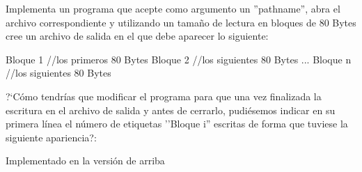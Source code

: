 \begin{exercise}
Implementa un programa que acepte como argumento un ''pathname'', abra el
archivo correspondiente y utilizando un tamaño de lectura en bloques de 80 Bytes cree un
archivo de salida en el que debe aparecer lo siguiente:
\begin{bashcode}
Bloque 1
//los primeros 80 Bytes
Bloque 2
//los siguientes 80 Bytes
...
Bloque n
//los siguientes 80 Bytes
\end{bashcode}

?`Cómo tendrías que modificar el programa para que una vez
finalizada la escritura en el archivo de salida y antes de cerrarlo, pudiésemos indicar en su
primera línea el número de etiquetas ''Bloque i'' escritas de forma que tuviese la siguiente
apariencia?:

{\color{blue} Implementado en la versión de arriba}
\end{exercise}

